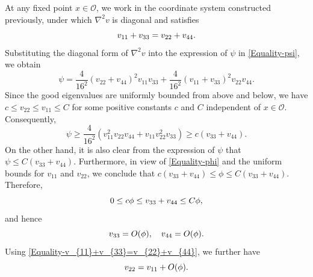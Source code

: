 \documentclass[11pt]{amsart}
\numberwithin{theorem}{section}
\numberwithin{equation}{section}
\begin{document}
At any fixed point $x\in\mathcal{O}$, we work in the coordinate system constructed previously, under which $\nabla^2v$ is diagonal and satisfies  
\begin{equation}\label{Equality-v_{11}+v_{33}=v_{22}+v_{44}}
v_{11}+v_{33}=v_{22}+v_{44}.
\end{equation}
Substituting the diagonal form of $\nabla^2v$ into the expression of $\psi$ in \eqref{Equality-psi}, we obtain $$\psi=\frac{4}{16^2}(v_{22}+v_{44})^2v_{11}v_{33}+\frac{4}{16^2}(v_{11}+v_{33})^2v_{22}v_{44}.$$ Since the good eigenvalues are uniformly bounded from above and below, we have $c\leq v_{22}\leq v_{11}\leq C$ for some positive constants $c$ and $C$ independent of $x\in\mathcal{O}$. Consequently, 
\begin{equation}\label{Estimate-psi}
\psi\geq\frac{4}{16^2}(v_{11}^2v_{22}v_{44}+v_{11}v_{22}^2v_{33})\geq c(v_{33}+v_{44}).
\end{equation}
On the other hand, it is also clear from the expression of $\psi$ that $\psi\leq C(v_{33}+v_{44})$. Furthermore, in view of \eqref{Equality-phi} and the uniform bounds for $v_{11}$ and $v_{22}$, we conclude that $c(v_{33}+v_{44})\leq\phi\leq C(v_{33}+v_{44})$. Therefore,
\begin{equation}\label{Estimate-v_{33}+v_{44}=phi}
0\leq c\phi\leq v_{33}+v_{44}\leq C\phi,
\end{equation}
and hence
\begin{equation}\label{Estimate-v_{33},v_{44}}
 v_{33}=O(\phi),\quad v_{44}=O(\phi).
\end{equation}
Using \eqref{Equality-v_{11}+v_{33}=v_{22}+v_{44}}, we further have
\begin{equation}\label{Estimate-v_{22}}
v_{22}=v_{11}+O(\phi).
\end{equation}
\end{document}
